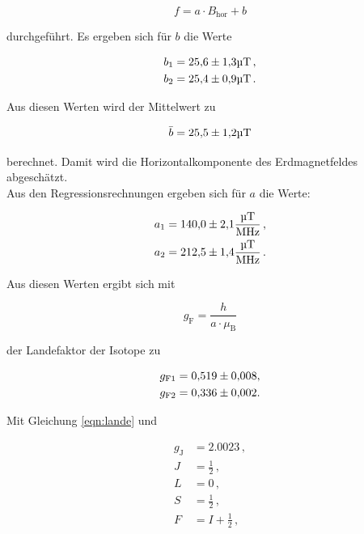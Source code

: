 \begin{equation*}
  f = a\cdot B_\text{hor} + b
\end{equation*}

durchgeführt. Es ergeben sich für $b$ die Werte

\begin{align*}
  b_1 &= \num{25.6\pm 1.3}\si{\micro\tesla}\,,\\
  b_2 &= \num{25.4\pm 0.9}\si{\micro\tesla}\,.\\
\end{align*}

Aus diesen Werten wird der Mittelwert zu 

\begin{equation*}
  \bar{b} = \num{25.5\pm 1.2}\si{\micro\tesla}
\end{equation*}

berechnet. Damit wird die Horizontalkomponente des Erdmagnetfeldes abgeschätzt.\\
Aus den Regressionsrechnungen ergeben sich für $a$ die Werte:

\begin{align*}
  a_1 &= \num{140.0\pm 2.1}\si{\micro\tesla\per\mega\hertz}\,,\\
  a_2 &= \num{212.5\pm 1.4}\si{\micro\tesla\per\mega\hertz}\,.\\
\end{align*}

Aus diesen Werten ergibt sich mit 

\begin{equation*}
  g_\text{F} = \frac{h}{a\cdot \mu_\text{B}}
\end{equation*}

der Landefaktor der Isotope zu

\begin{align*}
  g_\text{F1} &= \num{0.519\pm 0.008},\\
  g_\text{F2} &= \num{0.336\pm 0.002}.
\end{align*}

Mit Gleichung \eqref{eqn:lande} und 

\begin{align*}
  g_\text{J} &= \num{2.0023}\,,\\
  J &= \frac{1}{2}\,,\\
  L &= 0\,,\\
  S &= \frac{1}{2}\,,\\
  F &= I +\frac{1}{2}\,,\\
\end{align*}

